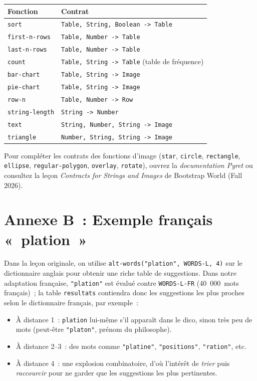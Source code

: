 \documentclass[12pt,a4paper]{article}
\begin{document}
\begin{center}
\begin{tabularx}{\textwidth}{l X}
  \toprule
  \textbf{Fonction} & \textbf{Contrat} \\
  \midrule
  \texttt{sort}         & \texttt{Table, String, Boolean -> Table} \\
  \texttt{first-n-rows} & \texttt{Table, Number -> Table} \\
  \texttt{last-n-rows}  & \texttt{Table, Number -> Table} \\
  \texttt{count}        & \texttt{Table, String -> Table} (table de fréquence) \\
  \texttt{bar-chart}    & \texttt{Table, String -> Image} \\
  \texttt{pie-chart}    & \texttt{Table, String -> Image} \\
  \texttt{row-n}        & \texttt{Table, Number -> Row} \\
  \texttt{string-length}& \texttt{String -> Number} \\
  \texttt{text}         & \texttt{String, Number, String -> Image} \\
  \texttt{triangle}     & \texttt{Number, String, String -> Image} \\
  \bottomrule
\end{tabularx}
\end{center}

Pour compléter les contrats des fonctions d'image (\texttt{star}, \texttt{circle}, \texttt{rectangle}, \texttt{ellipse}, \texttt{regular-polygon}, \texttt{overlay}, \texttt{rotate}), ouvrez la \emph{documentation Pyret} ou consultez la leçon \emph{Contracts for Strings and Images} de Bootstrap World (Fall 2026).

\section*{Annexe B~: Exemple français «~plation~»}

Dans la leçon originale, on utilise \texttt{alt-words("plation", WORDS-L, 4)} sur le dictionnaire anglais pour obtenir une riche table de suggestions. Dans notre adaptation française, \texttt{"plation"} est évalué contre \texttt{WORDS-L-FR} (40~000~mots français)~; la table \texttt{resultats} contiendra donc les suggestions les plus proches selon le dictionnaire français, par exemple~:

\begin{itemize}
  \item À distance 1~: \texttt{plation} lui-même s'il apparaît dans le dico, sinon très peu de mots (peut-être \texttt{"platon"}, prénom du philosophe).
  \item À distance 2--3~: des mots comme \texttt{"platine"}, \texttt{"positions"}, \texttt{"ration"}, etc.
  \item À distance 4~: une explosion combinatoire, d'où l'intérêt de \emph{trier} puis \emph{raccourcir} pour ne garder que les suggestions les plus pertinentes.
\end{itemize}
\end{document}
